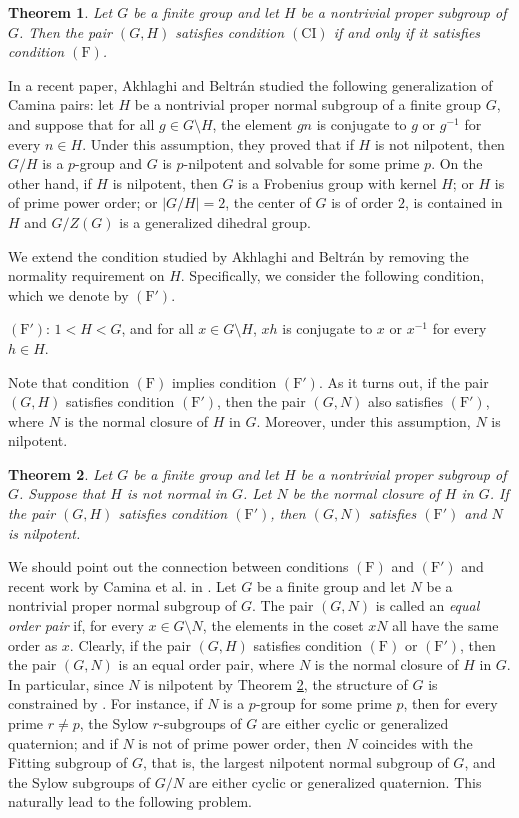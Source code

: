 \documentclass[twoside,a4paper,reqno,11pt]{amsart}
\newcommand{\<}{\langle}
\renewcommand{\>}{\rangle}
\newcommand{\F}{\mathrm{(F)}}
\newcommand{\CI}{\mathrm{(CI)}}
\newcommand{\Fp}{\mathrm{(F')}}
\renewcommand{\:}{\colon}
\newtheorem{theorem}{Theorem}
\theoremstyle{definition}
\begin{document}
\begin{theorem}\label{thm1}
	Let $G$ be a finite group and let $H$ be a nontrivial proper subgroup of $G$. Then the pair $(G,H)$ satisfies condition $\CI$ if and only if it satisfies condition $\F$. 
\end{theorem}

In a recent paper, Akhlaghi and Beltr\'{a}n \cite{Akhlaghi-Beltran} studied the following generalization of Camina pairs: let  $H$ be a nontrivial proper normal subgroup  of a finite group $G$, and suppose that for all $g\in G\setminus H$, the element $gn$ is conjugate to $g$ or $g^{-1}$ for every $n\in  H.$ Under this assumption, they proved that if $H$ is not nilpotent,  then $G/H$ is a $p$-group and $G$ is $p$-nilpotent and solvable for some prime $p.$ On the other hand, if $H$ is nilpotent, then $G$ is a Frobenius group with kernel $H$; or $H$ is of prime power order; or $|G/H|=2$, the center of $G$ is of order $2$, is contained in $H$ and $G/Z(G)$ is a generalized dihedral group.


We extend the condition studied by Akhlaghi and Beltr\'{a}n by removing the normality requirement on $H$. Specifically, we consider the following condition, which we denote by $\Fp$. 

\smallskip
{$\Fp$}: $1<H<G$, and for all $x\in G\setminus H$,  $xh$ is conjugate to $x$ or $x^{-1}$ for every $h\in H$. 
\smallskip

Note that condition $\F$ implies condition $\Fp$. As it turns out, if the pair $(G,H)$ satisfies condition $\Fp$, then the pair $(G,N)$ also satisfies $\Fp$, where $N$ is the normal closure of $H$ in $G$. Moreover, under this assumption, $N$ is nilpotent. 

\begin{theorem}\label{thm2}
	Let $G$ be a finite group and let $H$ be a nontrivial proper subgroup of $G$. Suppose that $H$ is not normal in $G$.  Let $N$ be the normal closure of $H$ in $G$. If the pair $(G,H)$ satisfies condition $\Fp$, then $(G,N)$ satisfies $\Fp$ and $N$ is nilpotent. 
\end{theorem}

We should point out the connection between conditions $\F$ and $\Fp$ and recent work by Camina et al. in \cite{Camina2}. Let $G$ be a finite group and let $N$ be a nontrivial proper normal subgroup of $G$. The pair $(G,N) $ is called an \emph{equal order pair} if, for every $x\in G\setminus N$, the elements in the coset $xN$ all have the same order as $x$. Clearly, if the pair $(G,H)$ satisfies condition $\F$ or $\Fp$, then the pair $(G,N)$ is an equal order pair, where $N$ is the normal closure of $H$ in $G$.  In particular, since $N$ is nilpotent by Theorem \ref{thm2}, the structure of $G$ is constrained by \cite[Theorem B]{Camina2}. For instance, if $N$ is a $p$-group for some prime $p$, then for every prime $r\neq p$, the Sylow $r$-subgroups of $G$ are either cyclic or generalized quaternion; and if $N$ is not of prime power order, then $N$ coincides with the Fitting subgroup of $G$, that is, the largest nilpotent normal subgroup of $G$, and the Sylow subgroups of $G/N$ are either cyclic or generalized quaternion. This naturally lead to the following problem.
\end{document}
